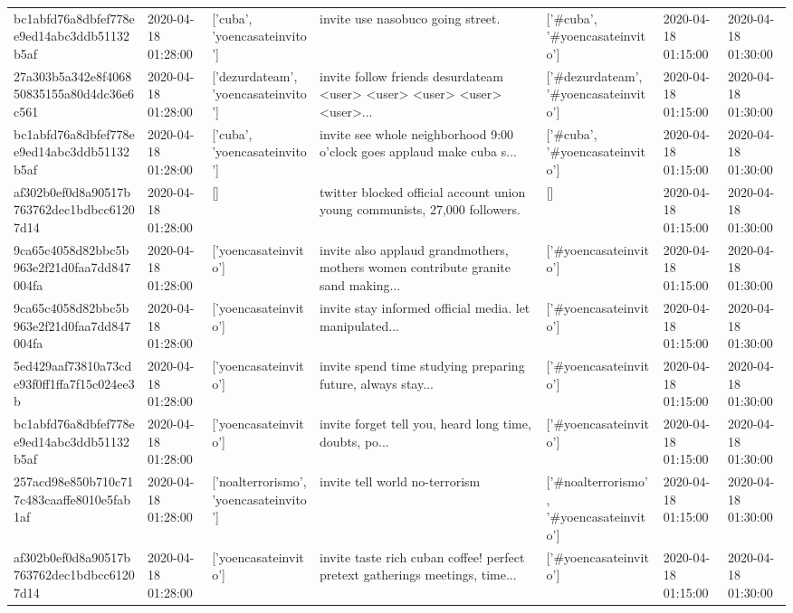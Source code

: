 \begin{tabular}{lllllll}
bc1abfd76a8dbfef778ee9ed14abc3ddb51132b5af & 2020-04-18 01:28:00 & ['cuba', 'yoencasateinvito'] & invite use nasobuco going street. & ['#cuba', '#yoencasateinvito'] & 2020-04-18 01:15:00 & 2020-04-18 01:30:00 \\
27a303b5a342e8f406850835155a80d4dc36e6c561 & 2020-04-18 01:28:00 & ['dezurdateam', 'yoencasateinvito'] & invite follow friends desurdateam <user> <user> <user> <user> <user>... & ['#dezurdateam', '#yoencasateinvito'] & 2020-04-18 01:15:00 & 2020-04-18 01:30:00 \\
bc1abfd76a8dbfef778ee9ed14abc3ddb51132b5af & 2020-04-18 01:28:00 & ['cuba', 'yoencasateinvito'] & invite see whole neighborhood 9:00 o'clock goes applaud make cuba s... & ['#cuba', '#yoencasateinvito'] & 2020-04-18 01:15:00 & 2020-04-18 01:30:00 \\
af302b0ef0d8a90517b763762dec1bdbcc61207d14 & 2020-04-18 01:28:00 & [] & twitter blocked official account union young communists, 27,000 followers. & [] & 2020-04-18 01:15:00 & 2020-04-18 01:30:00 \\
9ca65c4058d82bbc5b963e2f21d0faa7dd847004fa & 2020-04-18 01:28:00 & ['yoencasateinvito'] & invite also applaud grandmothers, mothers women contribute granite sand making... & ['#yoencasateinvito'] & 2020-04-18 01:15:00 & 2020-04-18 01:30:00 \\
9ca65c4058d82bbc5b963e2f21d0faa7dd847004fa & 2020-04-18 01:28:00 & ['yoencasateinvito'] & invite stay informed official media. let manipulated... & ['#yoencasateinvito'] & 2020-04-18 01:15:00 & 2020-04-18 01:30:00 \\
5ed429aaf73810a73cde93f0ff1ffa7f15c024ee3b & 2020-04-18 01:28:00 & ['yoencasateinvito'] & invite spend time studying preparing future, always stay... & ['#yoencasateinvito'] & 2020-04-18 01:15:00 & 2020-04-18 01:30:00 \\
bc1abfd76a8dbfef778ee9ed14abc3ddb51132b5af & 2020-04-18 01:28:00 & ['yoencasateinvito'] & invite forget tell you, heard long time, doubts, po... & ['#yoencasateinvito'] & 2020-04-18 01:15:00 & 2020-04-18 01:30:00 \\
257acd98e850b710c717c483caaffe8010e5fab1af & 2020-04-18 01:28:00 & ['noalterrorismo', 'yoencasateinvito'] & invite tell world no-terrorism & ['#noalterrorismo', '#yoencasateinvito'] & 2020-04-18 01:15:00 & 2020-04-18 01:30:00 \\
af302b0ef0d8a90517b763762dec1bdbcc61207d14 & 2020-04-18 01:28:00 & ['yoencasateinvito'] & invite taste rich cuban coffee! perfect pretext gatherings meetings, time... & ['#yoencasateinvito'] & 2020-04-18 01:15:00 & 2020-04-18 01:30:00 \\

\end{tabular}
